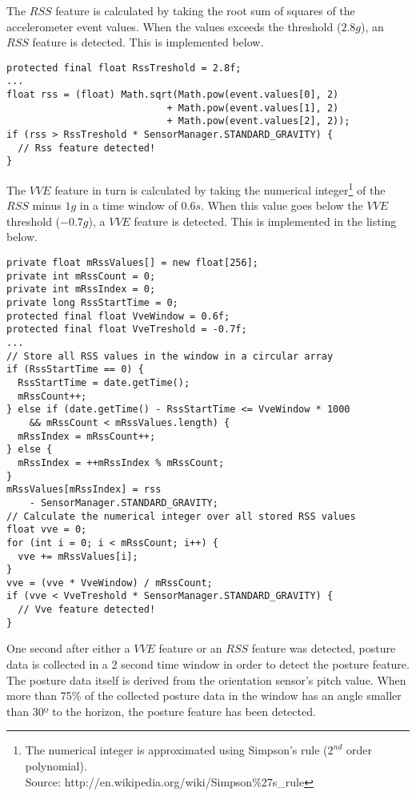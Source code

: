 \documentclass[a4paper, 10pt]{article}
\begin{document}
The $RSS$ feature is calculated by taking the root sum of squares of the accelerometer event values. When the values exceeds the threshold ($2.8g$), an $RSS$ feature is detected. This is implemented below.
\begin{lstlisting}
protected final float RssTreshold = 2.8f;
...
float rss = (float) Math.sqrt(Math.pow(event.values[0], 2)
                            + Math.pow(event.values[1], 2)
                            + Math.pow(event.values[2], 2));
if (rss > RssTreshold * SensorManager.STANDARD_GRAVITY) {  
  // Rss feature detected!
}
\end{lstlisting}
The $VVE$ feature in turn is calculated by taking the numerical integer\footnote{The numerical integer is approximated using Simpson's rule ($2^{nd}$ order polynomial).\\Source: http://en.wikipedia.org/wiki/Simpson\%27s\_rule} of the $RSS$ minus $1g$ in a time window of $0.6s$. When this value goes below the $VVE$ threshold ($-0.7g$), a $VVE$ feature is detected. This is implemented in the listing below.
\begin{lstlisting}
private float mRssValues[] = new float[256];
private int mRssCount = 0;
private int mRssIndex = 0;
private long RssStartTime = 0;
protected final float VveWindow = 0.6f;
protected final float VveTreshold = -0.7f;
...
// Store all RSS values in the window in a circular array
if (RssStartTime == 0) {
  RssStartTime = date.getTime();
  mRssCount++;
} else if (date.getTime() - RssStartTime <= VveWindow * 1000
    && mRssCount < mRssValues.length) {
  mRssIndex = mRssCount++;
} else {
  mRssIndex = ++mRssIndex % mRssCount;
}
mRssValues[mRssIndex] = rss
    - SensorManager.STANDARD_GRAVITY;
// Calculate the numerical integer over all stored RSS values
float vve = 0;
for (int i = 0; i < mRssCount; i++) {
  vve += mRssValues[i];
}
vve = (vve * VveWindow) / mRssCount;
if (vve < VveTreshold * SensorManager.STANDARD_GRAVITY) {
  // Vve feature detected!
}
\end{lstlisting}
One second after either a $VVE$ feature or an $RSS$ feature was detected, posture data is collected in a 2 second time window in order to detect the posture feature. The posture data itself is derived from the orientation sensor's pitch value. When more than 75\% of the collected posture data in the window has an angle smaller than 30º to the horizon, the posture feature has been detected.
\end{document}
